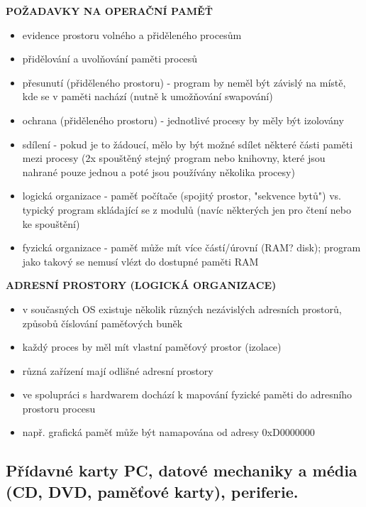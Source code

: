 \documentclass[10pt,a4paper]{article}
\begin{document}
\textbf{POŽADAVKY NA OPERAČNÍ PAMĚŤ}
\begin{itemize}
	\item evidence prostoru volného a přiděleného procesům
	\item přidělování a uvolňování paměti procesů
	\item přesunutí (přiděleného prostoru) - program by neměl být závislý na místě, kde se v paměti
nachází (nutně k umožňování swapování)
	\item ochrana (přiděleného prostoru) - jednotlivé procesy by měly být izolovány
	\item sdílení - pokud je to žádoucí, mělo by být možné sdílet některé části paměti mezi procesy
(2x spouštěný stejný program nebo knihovny, které jsou nahrané pouze jednou a poté jsou
používány několika procesy)
	\item logická organizace - paměť počítače (spojitý prostor, "sekvence bytů") vs. typický program
skládající se z modulů (navíc některých jen pro čtení nebo ke spouštění)
	\item fyzická organizace - paměť může mít více částí/úrovní (RAM? disk); program jako takový
se nemusí vlézt do dostupné paměti RAM
\end{itemize}

\textbf{ADRESNÍ PROSTORY (LOGICKÁ ORGANIZACE)}
\begin{itemize}
	\item v současných OS existuje několik různých nezávislých adresních prostorů, způsobů číslování
paměťových buněk
	\item každý proces by měl mít vlastní paměťový prostor (izolace)
	\item různá zařízení mají odlišné adresní prostory
	\item ve spolupráci s hardwarem dochází k mapování fyzické paměti do adresního prostoru procesu
	\item např. grafická paměť může být namapována od adresy 0xD0000000
\end{itemize}


\clearpage
\subsection{Přídavné karty PC, datové mechaniky a média (CD, DVD, paměťové karty), periferie.}


\clearpage
\end{document}
